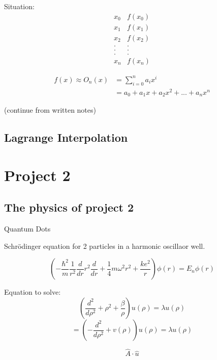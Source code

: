 \documentclass[10pt]{article} %
\begin{document}
Situation:
\[ \begin{array}{cc}
x_0 & f(x_0) \\ x_1 & f(x_1) \\ x_2 & f(x_2) \\ .&. \\ .&. \\ .&. \\ x_n & f(x_n)
\end{array} \]

\begin{align*}
f(x) \approx O_n(x) &= \sum_{i=0}^n a_i x^i \\
& = a_0 + a_1x + a_2x^2 + ... + a_nx^n 
\end{align*}

(continue from written notes)

\subsection{Lagrange Interpolation}

\section{Project 2}

\subsection{The physics of project 2}

Quantum Dots

Schr\"{o}dinger equation for 2 particles in a harmonic oscillaor well.

\[ \left( -\dfrac{\hbar^2}{m} \dfrac{1}{r^2}\dfrac{d}{dr}r^2\dfrac{d}{dr} + \dfrac{1}{4}{m\omega^2r^2}+\dfrac{ke^2}{r} \right) \phi(r) = E_n \phi(r) \]

Equation to solve:
\[ \left( \dfrac{d^2}{d\rho^2}+\rho^2+\dfrac{\beta}{\rho} \right) u(\rho) = \lambda u(\rho) \]
\[ = \left( -\dfrac{d^2}{d\rho^2} + v(\rho) \right) u(\rho) = \lambda u(\rho) \]


\[ \hat{A} \cdot \hat{u} \]

\[ 
\begin{array}{ccccc} \end{array}
\]
\end{document}
